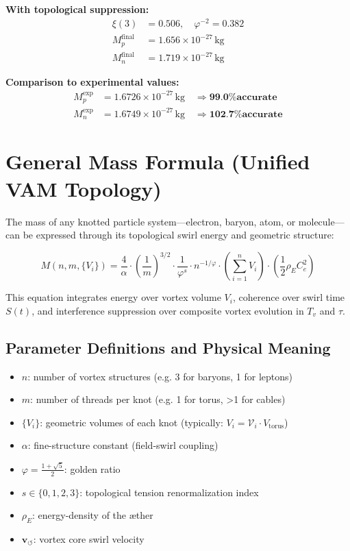 \documentclass[12pt]{article}
\begin{document}
\textbf{With topological suppression:}
\begin{align*}
\xi(3) &= 0.506, \quad \varphi^{-2} = 0.382 \\
M_p^{\text{final}} &= 1.656 \times 10^{-27} \, \text{kg} \\
M_n^{\text{final}} &= 1.719 \times 10^{-27} \, \text{kg}
\end{align*}

\textbf{Comparison to experimental values:}
\begin{align*}
M_p^{\text{exp}} &= 1.6726 \times 10^{-27} \, \text{kg} \quad \Rightarrow \textbf{99.0\% accurate} \\
M_n^{\text{exp}} &= 1.6749 \times 10^{-27} \, \text{kg} \quad \Rightarrow \textbf{102.7\% accurate}
\end{align*}
\section{General Mass Formula (Unified VAM Topology)}\label{sec:master-mass-formula}

The mass of any knotted particle system—electron, baryon, atom, or molecule—can be expressed through its topological swirl energy and geometric structure:

\[
\boxed{
M(n, m, \{V_i\}) = \frac{4}{\alpha} \cdot \left( \frac{1}{m} \right)^{3/2} \cdot \frac{1}{\varphi^s} \cdot n^{-1/\varphi} \cdot \left( \sum_{i=1}^n V_i \right) \cdot \left( \frac{1}{2} \rho_{\scriptscriptstyle\boldsymbol\!E}C_e^2 \right)
}
\]

This equation integrates energy over vortex volume $V_i$, coherence over swirl time $S(t)$, and interference suppression over composite vortex evolution in $T_v$ and $\tau$.

\subsection{Parameter Definitions and Physical Meaning}

\begin{itemize}
  \item \( n \): number of vortex structures (e.g. 3 for baryons, 1 for leptons)
  \item \( m \): number of threads per knot (e.g. 1 for torus, >1 for cables)
  \item \( \{V_i\} \): geometric volumes of each knot (typically: \( V_i = \mathcal{V}_i \cdot V_{\text{torus}} \))
  \item \( \alpha \): fine-structure constant (field-swirl coupling)
  \item \( \varphi = \frac{1+\sqrt{5}}{2} \): golden ratio
  \item \( s \in \{0, 1, 2, 3\} \): topological tension renormalization index
  \item \( \rho_{\scriptscriptstyle\boldsymbol\!E}\): energy-density of the æther
  \item \( \mathbf{v}_{\scriptscriptstyle\boldsymbol{\circlearrowleft}} \): vortex core swirl velocity
\end{itemize}
\end{document}
